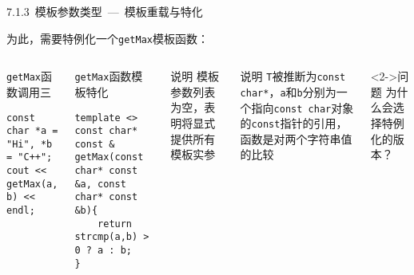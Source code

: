 \begin{frame}[fragile]{7.1.3~模板参数类型\normalsize{~---~模板重载与特化}}

为此，需要\alert{特例化}一个\texttt{getMax}模板函数：

\vspace{-4mm}

\begin{columns}[t]

\begin{blueblock}{\texttt{getMax}函数调用三}
\begin{lstlisting}[moreemph={T}]
const char *a = "Hi", *b = "C++";
cout << getMax(a, b) << endl;
\end{lstlisting}
\end{blueblock}
\begin{blueblock}{\texttt{getMax}函数模板特化}
\begin{lstlisting}[moreemph={T}]
template <>
const char* const & getMax(const char* const &a, const char* const &b){
    return strcmp(a,b) > 0 ? a : b;
}
\end{lstlisting}
\end{blueblock}


\begin{yellowblock}{说明}
模板参数列表为空，表明将显式提供所有模板实参
\end{yellowblock}
\vspace{-2mm}
\begin{yellowblock}{说明}
\texttt{T}被推断为\texttt{const char*}，\texttt{a}和\texttt{b}分别为一个指向\texttt{const char}对象的\texttt{const}指针的引用，函数是对两个字符串值的比较
\end{yellowblock}
\vspace{-2mm}
\begin{greenblock}<2->{问题}
为什么会选择特例化的版本？
\end{greenblock}

\end{columns}

\end{frame}


